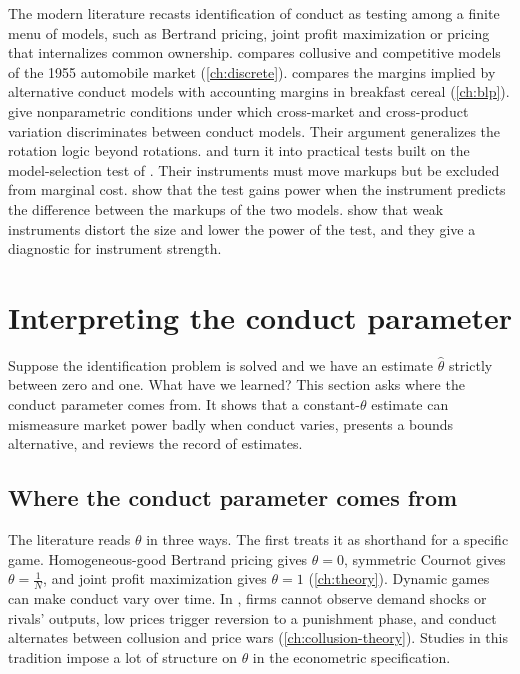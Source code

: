 The modern literature recasts identification of conduct as testing among a finite menu of models, such as Bertrand pricing,
joint profit maximization or pricing that internalizes common ownership. \citet{Bresnahan1987} compares collusive and
competitive models of the 1955 automobile market (\cref{ch:discrete}). \citet{Nevo2001} compares the margins implied by
alternative conduct models with accounting margins in breakfast cereal (\cref{ch:blp}). \citet[Section~6]{BerryHaile2014}
give nonparametric conditions under which cross-market and cross-product variation discriminates between conduct models.
Their argument generalizes the rotation logic beyond rotations. \citet{BackusConlonSinkinson2021} and
\citet{DuarteEtAl2024} turn it into practical tests built on the model-selection test of \citet{RiversVuong2002}. Their
instruments must move markups but be excluded from marginal cost. \citet[Section~2.2]{BackusConlonSinkinson2021} show
that the test gains power when the instrument predicts the difference between the markups of the two models.
\citet[Section~5]{DuarteEtAl2024} show that weak instruments distort the size and lower the power of the test, and they
give a diagnostic for instrument strength.

\section{Interpreting the conduct parameter}\label{sec:03-interpreting}

Suppose the identification problem is solved and we have an estimate $\hat\theta$ strictly between zero and one. What
have we learned? This section asks where the conduct parameter comes from. It shows that a constant-$\theta$ estimate
can mismeasure market power badly when conduct varies, presents a bounds alternative, and reviews the record of estimates.

\subsection{Where the conduct parameter comes from}\label{sec:03-theta-origins}

The literature reads $\theta$ in three ways. The first treats it as shorthand for a specific game. Homogeneous-good
Bertrand pricing gives $\theta = 0$, symmetric Cournot gives $\theta = \frac{1}{N}$, and joint profit maximization gives
$\theta = 1$ (\cref{ch:theory}). Dynamic games can make conduct vary over time. In \citet{GreenPorter1984}, firms cannot
observe demand shocks or rivals' outputs, low prices trigger reversion to a punishment phase, and conduct alternates
between collusion and price wars (\cref{ch:collusion-theory}). Studies in this tradition impose a lot of structure on
$\theta$ in the econometric specification.

